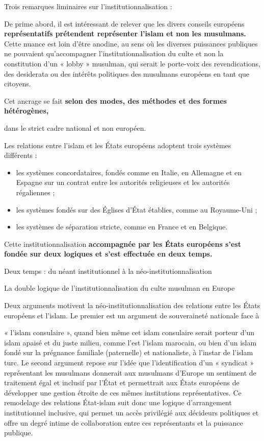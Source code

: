 Trois remarques liminaires sur l'institutionnalisation :


De prime abord, il est intéressant de relever que les divers conseils
européens \textbf{représentatifs prétendent représenter l'islam et non
les musulmans.} Cette nuance est loin d'être anodine, au sens où les
diverses puissances publiques ne pouvaient qu'accompagner
l'institutionnalisation du culte et non la constitution d'un « lobby »
musulman, qui serait le porte-voix des revendications, des desiderata ou
des intérêts politiques des musulmans européens en tant que citoyens.

Cet ancrage se fait \textbf{selon des modes, des méthodes et des formes
hétérogènes,}

dans le strict cadre national et non européen.

Les relations entre l'islam et les États européens adoptent trois
systèmes différents :


\begin{itemize}
\item
  les systèmes concordataires, fondés comme en Italie, en Allemagne et
  en Espagne sur un contrat entre les autorités religieuses et les
  autorités régaliennes ;
\item
  les systèmes fondés sur des Églises d'État établies, comme au
  Royaume-Uni ;
\item
  les systèmes de séparation stricte, comme en France et en Belgique.
\end{itemize}


Cette institutionnalisation \textbf{accompagnée par les États européens
s'est fondée sur deux logiques et s'est effectuée en deux temps.}




Deux temps : du néant institutionnel à la néo-institutionnalisation


La double logique de l'institutionnalisation du culte musulman en Europe

Deux arguments motivent la néo-institutionnalisation des relations entre
les États européens et l'islam. Le premier est un argument de
souveraineté nationale face à

« l'islam consulaire », quand bien même cet islam consulaire serait
porteur d'un islam apaisé et du juste milieu, comme l'est l'islam
marocain, ou bien d'un islam fondé sur la prégnance familiale
(paternelle) et nationaliste, à l'instar de l'islam turc. Le second
argument repose sur l'idée que l'identification d'un « syndicat »
représentant les musulmans donnerait aux musulmans d'Europe un sentiment
de traitement égal et inclusif par l'État et permettrait aux États
européens de développer une gestion étroite de ces mêmes institutions
représentatives. Ce remodelage des relations État-islam suit donc une
logique d'arrangement institutionnel inclusive, qui permet un accès
privilégié aux décideurs politiques et offre un degré intime de
collaboration entre ces représentants et la puissance publique.



